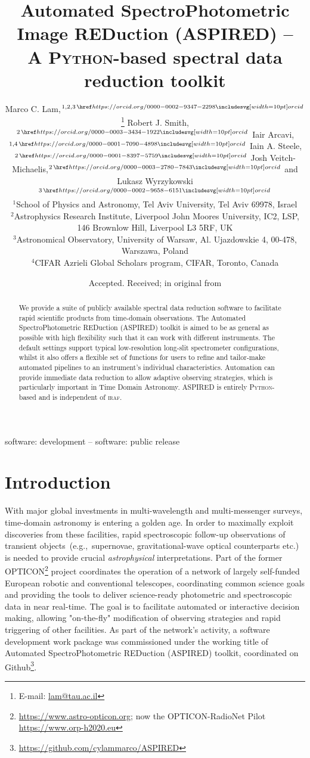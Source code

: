 \documentclass[fleqn,usenatbib]{mnras}
\title[ASPIRED]{Automated SpectroPhotometric Image REDuction (ASPIRED) -- \\ A \textsc{Python}-based spectral data reduction toolkit\\
}
\author[M. C. Lam et al.]
{Marco C. Lam,$^{1, 2, 3\,\orcid{0000-0002-9347-2298}}$\thanks{E-mail: \href{mailto:lam@tau.ac.il}{lam@tau.ac.il}}
Robert J. Smith,$^{2\,\orcid{0000-0003-3434-1922}}$
Iair Arcavi,$^{1, 4\,\orcid{0000-0001-7090-4898}}$
Iain A. Steele,$^{2\,\orcid{0000-0001-8397-5759}}$
\newauthor Josh Veitch-Michaelis,$^{2\,\orcid{0000-0003-2780-7843}}$ and
Lukasz Wyrzykowski$^{3\,\orcid{0000-0002-9658-6151}}$\\
$^{1}$School of Physics and Astronomy, Tel Aviv University, Tel Aviv 69978, Israel\\
$^{2}$Astrophysics Research Institute, Liverpool John Moores University, IC2, LSP, 146 Brownlow Hill, Liverpool L3 5RF, UK\\
$^{3}$Astronomical Observatory, University of Warsaw, Al. Ujazdowskie 4, 00-478, Warszawa, Poland\\
$^{4}$CIFAR Azrieli Global Scholars program, CIFAR, Toronto, Canada
}
\date{Accepted. Received; in original from}
\begin{document}
\label{firstpage}
\pagerange{\pageref{firstpage}--\pageref{lastpage}}
\maketitle

\begin{abstract}
We provide a suite of publicly available spectral data reduction software to facilitate
rapid scientific products from time-domain observations. The Automated SpectroPhotometric
REDuction (\textsc{ASPIRED}) toolkit is aimed to be as general as possible with high flexibility
such that it can work with different instruments. The default settings support typical
low-resolution long-slit spectrometer configurations, whilst it also offers a flexible set of
functions for users to refine and tailor-make automated pipelines to an instrument's
individual characteristics. Automation can provide immediate data reduction to allow adaptive
observing strategies, which is particularly important in Time Domain Astronomy. \textsc{ASPIRED} is
entirely \textsc{Python}-based and is independent of \textsc{iraf}.
\end{abstract}

\begin{keywords}
software: development -- software: public release
\end{keywords}



\section{Introduction}
With major global investments in multi-wavelength and multi-messenger surveys, time-domain
astronomy is entering a golden age. In order to maximally exploit discoveries from these
facilities, rapid spectroscopic follow-up observations of transient objects~(e.g.,\ supernovae,
gravitational-wave optical counterparts etc.) is needed to provide crucial {\em astrophysical} 
interpretations. Part of the former OPTICON\footnote{\url{https://www.astro-opticon.org}; now the
OPTICON-RadioNet Pilot \url{https://www.orp-h2020.eu}} project coordinates the operation of a
network of largely self-funded European robotic and conventional telescopes, coordinating
common science goals and providing the tools to deliver science-ready photometric and
spectroscopic data in near real-time. The goal is to facilitate automated or interactive
decision making, allowing "on-the-fly" modification of observing strategies and rapid
triggering of other facilities. As part of the network's activity, a software development work package was
commissioned under the working title of Automated SpectroPhotometric REDuction (\textsc{ASPIRED})
toolkit, coordinated on Github\footnote{\url{https://github.com/cylammarco/ASPIRED}}.
\end{document}
